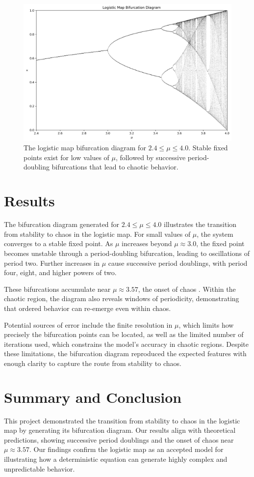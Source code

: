 \documentclass[linenumbers, RNAAS, trackchanges]{aastex631}
\begin{document}
\begin{figure}[H]
    \centering
    \includegraphics[width=0.65\linewidth]{bifurcation.png}
    \caption{The logistic map bifurcation diagram for $2.4\leq \mu \leq 4.0$. Stable fixed points exist for low values of $\mu$, followed by successive period-doubling bifurcations that lead to chaotic behavior.}
    \label{fig:bifurcation}
\end{figure}


\section{Results} \label{sec:results}
The bifurcation diagram generated for $2.4\leq\mu\leq4.0$ illustrates the
transition from stability to chaos in the logistic map. For small values of
$\mu$, the system converges to a stable fixed point. As $\mu$ increases beyond
$\mu\approx3.0$, the fixed point becomes unstable through a period-doubling
bifurcation, leading to oscillations of period two. Further increases in $\mu$
cause successive period doublings, with period four, eight, and higher powers
of two.

These bifurcations accumulate near $\mu\approx3.57$, the onset of chaos
\cite{feig, chen}. Within the chaotic region, the diagram also reveals
windows of periodicity, demonstrating that ordered behavior can re-emerge
even within chaos.

Potential sources of error include the finite resolution in $\mu$, which limits
how precisely the bifurcation points can be located, as well as the limited
number of iterations used, which constrains the model's accuracy in chaotic
regions. Despite these limitations, the bifurcation diagram reproduced the
expected features with enough clarity to capture the route from stability
to chaos.

\section{Summary and Conclusion} \label{sec:summary}
This project demonstrated the transition from stability to chaos in the
logistic map by generating its bifurcation diagram. Our results align with
theoretical predictions, showing successive period doublings and the onset of
chaos near $\mu\approx3.57$. Our findings confirm the logistic map as an
accepted model for illustrating how a deterministic equation can generate highly
complex and unpredictable behavior.
\end{document}
